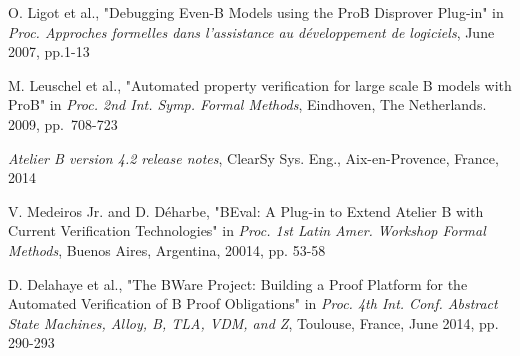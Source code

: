 \documentclass[11pt,journal]{IEEEtran}
\begin{document}
\begin{thebibliography}{1}
		O. Ligot et al., "Debugging Even-B Models using the ProB Disprover Plug-in" in \emph{Proc. Approches formelles dans l'assistance au d\'{e}veloppement de logiciels}, June 2007, pp.1-13
		
		M. Leuschel et al., "Automated property verification for large scale B models with ProB" in \emph{Proc. 2nd Int. Symp. Formal Methods}, Eindhoven, The Netherlands. 2009, pp.~708-723
		
		\emph{Atelier B version 4.2 release notes}, ClearSy Sys. Eng., Aix-en-Provence, France, 2014
		
		V. Medeiros Jr. and D. D\'{e}harbe, "BEval: A Plug-in to Extend Atelier B with Current Verification Technologies" in \emph{Proc. 1st Latin Amer. Workshop Formal Methods}, Buenos Aires, Argentina, 20014, pp. 53-58
		
		D. Delahaye et al., "The BWare Project: Building a Proof Platform for the Automated Verification of B Proof Obligations" in \emph{Proc. 4th Int. Conf. Abstract State Machines, Alloy, B, TLA, VDM, and Z}, Toulouse, France, June 2014, pp. 290-293
		
		
	\end{thebibliography}
	
\end{document}
